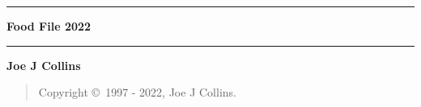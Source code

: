 \documentclass{./FoodFile}
\begin{document}
\thispagestyle{empty}
\begin{center}
\hrule
\vspace{5mm}
{\Huge\bf Food File 2022}
\vspace{5mm}
\hrule
\vfill
{\bf Joe J Collins}
\end{center}
\clearpage
\strut %
\vfill
\begin{quotation}
Copyright \copyright\ 1997 - 2022, Joe J Collins.
\end{quotation}
\clearpage
{}


\printindex
\end{document}
